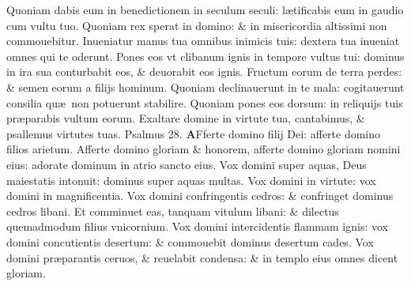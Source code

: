 \documentclass[a5paper,10pt]{book}
\def\ae{æ}
\begin{document}
\begin{multicols*}{2}
\newline \color{red} Q\color{black}uoniam dabis eum in benedictionem in seculum seculi: l\ae tificabis eum in gaudio cum vultu tuo.
\newline \color{red} Q\color{black}uoniam rex sperat in domino: \& in misericordia altissimi non commouebitur.
\newline \color{red} I\color{black}nueniatur manus tua omnibus inimicis tuis: dextera tua inueniat omnes qui te oderunt.
\newline \color{red} P\color{black}ones eos vt clibanum ignis in tempore vultus tui: dominus in ira sua conturbabit eos, \& deuorabit eos ignis.
\newline \color{red} F\color{black}ructum eorum de terra perdes: \& semen eorum a filijs hominum.
\newline \color{red} Q\color{black}uoniam declinauerunt in te mala: cogitauerunt consilia qu\ae \ non potuerunt stabilire.
\newline \color{red} Q\color{black}uoniam pones eos dorsum: in reliquijs tuis pr\ae parabis vultum eorum.
\newline \color{red} E\color{black}xaltare domine in virtute tua, cantabimus, \& psallemus virtutes tuas.
\newline \color{red} Psalmus \hypertarget{ps28}{28.} \color{black}
\vspace{-1em}
\lettrine[lines=2]{\bfseries \color{red} A}{}Fferte domino filij Dei: afferte domino filios arietum.
\newline \color{red} A\color{black}fferte domino gloriam \& honorem, afferte domino gloriam nomini eius: adorate dominum in atrio sancto eius.
\newline \color{red} V\color{black}ox domini super aquas, Deus maiestatis intonuit: dominus super aquas multas.
\newline \color{red} V\color{black}ox domini in virtute: vox domini in magnificentia.
\newline \color{red} V\color{black}ox domini confringentis cedros: \& confringet dominus cedros libani.
\newline \color{red} E\color{black}t comminuet eas, tanquam vitulum libani: \& dilectus quemadmodum filius vnicornium.
\newline \color{red} V\color{black}ox domini intercidentis flammam ignis: vox domini concutientis desertum: \& commouebit dominus desertum cades.
\newline \color{red} V\color{black}ox domini pr\ae parantis ceruos, \& reuelabit condensa: \& in templo eius omnes dicent gloriam.

\end{multicols*}
\end{document}
